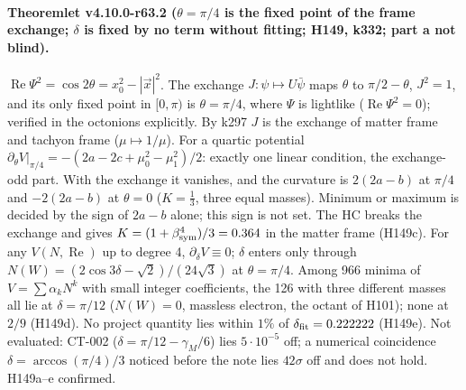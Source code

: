 \paragraph{Theoremlet v4.10.0-r63.2 (\(\theta=\pi/4\) is the fixed point of the frame exchange; \(\delta\) is fixed by no term without fitting; H149, k332; part a not blind).}
\(\operatorname{Re}\Psi^2=\cos2\theta=x_0^2-|\vec x|^2\).  The exchange \(J:\psi\mapsto U\bar\psi\) maps \(\theta\) to \(\pi/2-\theta\), \(J^2=1\),
and its only fixed point in \([0,\pi)\) is \(\theta=\pi/4\), where \(\Psi\) is lightlike (\(\operatorname{Re}\Psi^2=0\)); verified in the octonions
explicitly.  By k297 \(J\) is the exchange of matter frame and tachyon frame (\(\mu\mapsto1/\mu\)).  For a quartic potential
\(\partial_\theta V|_{\pi/4}=-(2a-2c+\mu_0^2-\mu_1^2)/2\): exactly one linear condition, the exchange-odd part.  With the exchange it vanishes, and
the curvature is \(2(2a-b)\) at \(\pi/4\) and \(-2(2a-b)\) at \(\theta=0\) (\(K=\tfrac13\), three equal masses).  Minimum or maximum is decided by
the sign of \(2a-b\) alone; this sign is not set.  The HC breaks the exchange and gives \(K=(1+\beta_{\rm sym}^4)/3=0.364\) in the matter frame
(H149c).  For any \(V(N,\operatorname{Re})\) up to degree 4, \(\partial_\delta V\equiv0\); \(\delta\) enters only through
\(N(W)=(2\cos3\delta-\sqrt2)/(24\sqrt3)\) at \(\theta=\pi/4\).  Among 966 minima of \(V=\sum\alpha_kN^k\) with small integer coefficients, the 126
with three different masses all lie at \(\delta=\pi/12\) (\(N(W)=0\), massless electron, the octant of H101); none at \(2/9\) (H149d).  No project
quantity lies within \(1\%\) of \(\delta_{\rm fit}=0.222222\) (H149e).  Not evaluated: CT-002 (\(\delta=\pi/12-\gamma_M/6\)) lies \(5\cdot10^{-5}\)
off; a numerical coincidence \(\delta=\arccos(\pi/4)/3\) noticed before the note lies \(42\sigma\) off and does not hold.  H149a--e confirmed.

